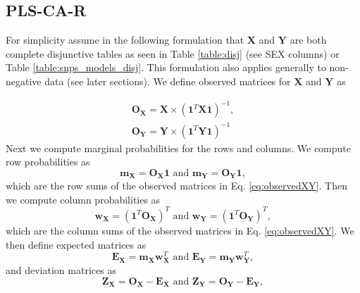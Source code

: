 \documentclass[12pt]{article}
\begin{document}
\hypertarget{pls-ca-r}{%
\subsection{PLS-CA-R}\label{pls-ca-r}}

\label{section:plscar_form}

For simplicity assume in the following formulation that \({\mathbf X}\)
and \({\mathbf Y}\) are both complete disjunctive tables as seen in
Table \ref{table:disj} (see SEX columns) or Table
\ref{table:snps_models_disj}. This formulation also applies generally to
non-negative data (see later sections). We define observed matrices for
\({\mathbf X}\) and \({\mathbf Y}\) as

\begin{equation}
\begin{aligned}
{\mathbf O}_{\mathbf X} = {\mathbf X} \times ({\mathbf 1}^{T}{\mathbf X} {\mathbf 1})^{-1}, \\
{\mathbf O}_{\mathbf Y} = {\mathbf Y} \times ({\mathbf 1}^{T}{\mathbf Y} {\mathbf 1})^{-1}
\label{eq:observedXY}
\end{aligned}
\end{equation} Next we compute marginal probabilities for the rows and
columns. We compute row probabilities as \begin{equation}
{\mathbf m}_{\mathbf X} = {\mathbf O}_{\mathbf X}{\mathbf 1} \text{ and } {\mathbf m}_{\mathbf Y} = {\mathbf O}_{\mathbf Y}{\mathbf 1},
\label{eq:xy_rowvecs}
\end{equation} which are the row sums of the observed matrices in Eq.
\ref{eq:observedXY}. Then we compute column probabilities as
\begin{equation}
{\mathbf w}_{\mathbf X} = ({\mathbf 1}^{T}{\mathbf O}_{\mathbf X})^{T} \text{ and } {\mathbf w}_{\mathbf Y} = ({\mathbf 1}^{T}{\mathbf O}_{\mathbf Y})^{T},
\label{eq:weightmats_v1}
\end{equation} which are the column sums of the observed matrices in Eq.
\ref{eq:observedXY}. We then define expected matrices as
\begin{equation}
{\mathbf E}_{\mathbf X} = {\mathbf m}_{\mathbf X}{\mathbf w}_{\mathbf X}^{T} \text{ and } {\mathbf E}_{\mathbf Y} = {\mathbf m}_{\mathbf Y}{\mathbf w}_{\mathbf Y}^{T},
\label{eq:models}
\end{equation} and deviation matrices as \begin{equation}
{\mathbf Z}_{\mathbf X} = {\mathbf O}_{\mathbf X} - {\mathbf E}_{\mathbf X} \text{ and } {\mathbf Z}_{\mathbf Y} = {\mathbf O}_{\mathbf Y} - {\mathbf E}_{\mathbf Y},
\label{eq:plscar_Zs}
\end{equation}
\end{document}
